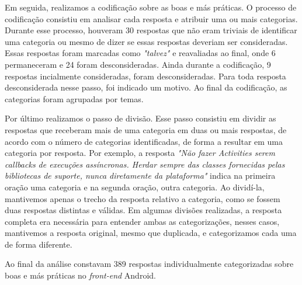Em seguida, realizamos a codifica\c{c}\~ao sobre as boas e m\'as pr\'aticas. O processo de codifica\c{c}\~ao consistiu em analisar cada resposta e atribuir uma ou mais categorias. Durante esse processo, houveram 30 respostas que n\~ao eram triviais de identificar uma categoria ou mesmo de dizer se essas respostas deveriam ser consideradas. Essas respostas foram marcadas como \textit{"talvez"} e reavaliadas ao final, onde 6 permaneceram e 24 foram desconsideradas. Ainda durante a codifica\c{c}\~ao, 9 respostas incialmente consideradas, foram desconsideradas. Para toda resposta desconsiderada nesse passo, foi indicado um motivo. Ao final da codifica\c{c}\~ao, as categorias foram agrupadas por temas.

Por \'ultimo realizamos o passo de divis\~ao. Esse passo consistiu em dividir as respostas que receberam mais de uma categoria em duas ou mais respostas, de acordo com o n\'umero de categorias identificadas, de forma a resultar em uma categoria por resposta. Por exemplo, a resposta \textit{"N\~ao fazer Activities serem callbacks de execu\c{c}\~oes ass\'incronas. Herdar sempre das classes fornecidas pelas bibliotecas de suporte, nunca diretamente da plataforma"} indica na primeira ora\c{c}\~ao uma categoria e na segunda ora\c{c}\~ao, outra categoria. Ao divid\'i-la, mantivemos apenas o trecho da resposta relativo a categoria, como se fossem duas respostas distintas e v\'alidas. Em algumas divis\~oes realizadas, a resposta completa era necess\'aria para entender ambas as categoriza\c{c}\~oes, nesses casos, mantivemos a resposta original, mesmo que duplicada, e categorizamos cada uma de forma diferente. 

Ao final da an\'alise constavam 389 respostas individualmente categorizadas sobre boas e m\'as pr\'aticas no \textit{front-end} Android.